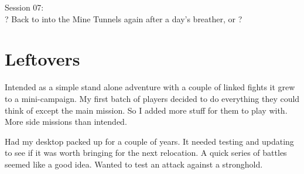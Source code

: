 Session 07:\\                                                           %
? Back to into the Mine Tunnels again after a day's breather, or ?













\clearpage
{}
\section*{Leftovers}
Intended as a simple stand alone adventure with a couple of linked fights it grew to a mini-campaign.
My first batch of players decided to do everything they could think of except the main mission. So I added more stuff for them to play with. More side missions than intended.

Had my desktop packed up for a couple of years. It needed testing and updating to see if it was worth bringing for the next relocation. A quick series of battles seemed like a good idea. Wanted to test an attack against a stronghold.


















